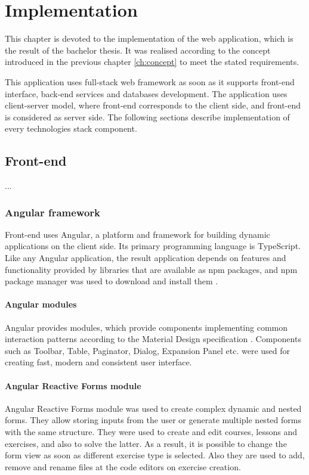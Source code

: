\chapter[Implementation]{Implementation}
\label{ch:implementation}
This chapter is devoted to the implementation of the web application, which is the result of the bachelor thesis. It was realised according to the concept introduced in the previous chapter \ref{ch:concept}  to meet the stated requirements.

This application uses full-stack web framework as soon as it supports front-end interface, back-end services and databases development. The application uses client-server model, where front-end corresponds to the client side, and front-end is considered as server side. The following sections describe implementation of every technologies stack component.

\section{Front-end}

...

\subsection{Angular framework}
Front-end uses Angular, a platform and framework for building dynamic applications on the client side. Its primary programming language is TypeScript. Like any Angular application, the result application depends on features and functionality provided by libraries that are available as npm packages, and npm package manager was used to download and install them \cite[Node.js]{angular_getting_started}.

\subsubsection{Angular modules}
Angular provides modules, which provide components implementing common interaction patterns according to the Material Design specification \cite[Components]{angular_components}. Components such as Toolbar, Table, Paginator, Dialog, Expansion Panel etc. were used for creating fast, modern and consistent user interface.

\subsubsection{Angular Reactive Forms module}
Angular Reactive Forms module was used to create complex dynamic and nested forms. They allow storing inputs from the user or generate multiple nested forms with the same structure. They were used to create and edit courses, lessons and exercises, and also to solve the latter. As a result, it is possible to change the form view as soon as different exercise type is selected. Also they are used to add, remove and rename files at the code editors on exercise creation.

